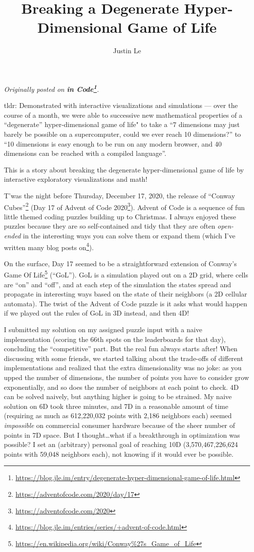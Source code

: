\documentclass[]{article}
\title{Breaking a Degenerate Hyper-Dimensional Game of Life}
\author{Justin Le}
\renewcommand{\href}[2]{#2\footnote{\url{#1}}}
\begin{document}
\maketitle

\emph{Originally posted on
\textbf{\href{https://blog.jle.im/entry/degenerate-hyper-dimensional-game-of-life.html}{in
Code}}.}

tldr: Demonstrated with interactive visualizations and simulations --- over the
course of a month, we were able to successive new mathematical properties of a
``degenerate'' hyper-dimensional game of life" to take a ``7 dimensions may just
barely be possible on a supercomputer, could we ever reach 10 dimensions?'' to
``10 dimensions is easy enough to be run on any modern browser, and 40
dimensions can be reached with a compiled language''.

This is a story about breaking the degenerate hyper-dimensional game of life by
interactive exploratory visualizations and math!

T'was the night before Thursday, December 17, 2020, the release of
\href{https://adventofcode.com/2020/day/17}{``Conway Cubes''} (Day 17 of
\href{https://adventofcode.com/2020}{Advent of Code 2020}). Advent of Code is a
sequence of fun little themed coding puzzles building up to Christmas. I always
enjoyed these puzzles because they are so self-contained and tidy that they are
often \emph{open-ended} in the interesting ways you can solve them or expand
them (which I've written
\href{https://blog.jle.im/entries/series/+advent-of-code.html}{many blog posts
on}).

On the surface, Day 17 seemed to be a straightforward extension of
\href{https://en.wikipedia.org/wiki/Conway\%27s_Game_of_Life}{Conway's Game Of
Life} (``GoL''). GoL is a simulation played out on a 2D grid, where cells are
``on'' and ``off'', and at each step of the simulation the states spread and
propagate in interesting ways based on the state of their neighbors (a 2D
cellular automata). The twist of the Advent of Code puzzle is it asks what would
happen if we played out the rules of GoL in 3D instead, and then 4D!

I submitted my solution on my assigned puzzle input with a naive implementation
(scoring the 66th spots on the leaderboards for that day), concluding the
``competitive'' part. But the real fun always starts after! When discussing with
some friends, we started talking about the trade-offs of different
implementations and realized that the extra dimensionality was no joke: as you
upped the number of dimensions, the number of points you have to consider grow
exponentially, and so does the number of neighbors at each point to check. 4D
can be solved naively, but anything higher is going to be strained. My naive
solution on 6D took three minutes, and 7D in a reasonable amount of time
(requiring as much as 612,220,032 points with 2,186 neighbors each) seemed
\emph{impossible} on commercial consumer hardware because of the sheer number of
points in 7D space. But I thought\ldots what if a breakthrough in optimization
was possible? I set an (arbitrary) personal goal of reaching 10D
(3,570,467,226,624 points with 59,048 neighbors each), not knowing if it would
ever be possible.
\end{document}
